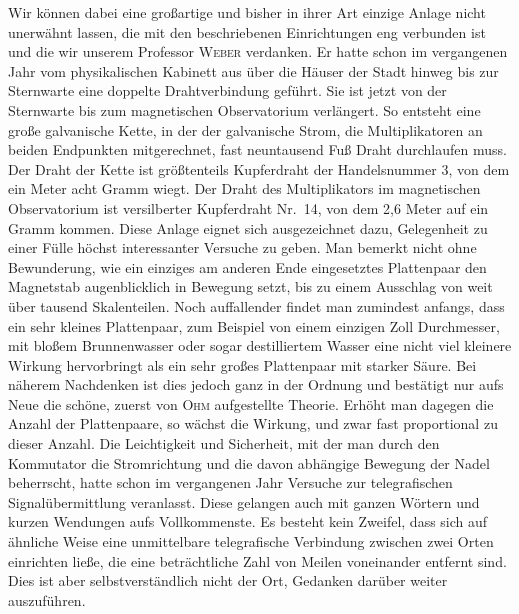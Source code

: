 Wir können dabei eine großartige und bisher in ihrer Art einzige Anlage nicht unerwähnt lassen, die mit den beschriebenen Einrichtungen eng verbunden ist und die wir unserem Professor \textsc{Weber} verdanken. Er hatte schon im vergangenen Jahr vom physikalischen Kabinett aus über die Häuser der Stadt hinweg bis zur Sternwarte eine doppelte Drahtverbindung geführt. Sie ist jetzt von der Sternwarte bis zum magnetischen Observatorium verlängert. So entsteht eine große galvanische Kette, in der der galvanische Strom, die Multiplikatoren an beiden Endpunkten mitgerechnet, fast neuntausend Fuß Draht durchlaufen muss. Der Draht der Kette ist größtenteils Kupferdraht der Handelsnummer 3, von dem ein Meter acht Gramm wiegt. Der Draht des Multiplikators im magnetischen Observatorium ist versilberter Kupferdraht Nr.\ 14, von dem 2,6 Meter auf ein Gramm kommen. Diese Anlage eignet sich ausgezeichnet dazu, Gelegenheit zu einer Fülle höchst interessanter Versuche zu geben. Man bemerkt nicht ohne Bewunderung, wie ein einziges am anderen Ende eingesetztes Plattenpaar den Magnetstab augenblicklich in Bewegung setzt, bis zu einem Ausschlag von weit über tausend Skalenteilen. Noch auffallender findet man zumindest anfangs, dass ein sehr kleines Plattenpaar, zum Beispiel von einem einzigen Zoll Durchmesser, mit bloßem Brunnenwasser oder sogar destilliertem Wasser eine nicht viel kleinere Wirkung hervorbringt als ein sehr großes Plattenpaar mit starker Säure. Bei näherem Nachdenken ist dies jedoch ganz in der Ordnung und bestätigt nur aufs Neue die schöne, zuerst von \textsc{Ohm} aufgestellte Theorie. Erhöht man dagegen die Anzahl der Plattenpaare, so wächst die Wirkung, und zwar fast proportional zu dieser Anzahl. Die Leichtigkeit und Sicherheit, mit der man durch den Kommutator die Stromrichtung und die davon abhängige Bewegung der Nadel beherrscht, hatte schon im vergangenen Jahr Versuche zur telegrafischen Signalübermittlung veranlasst. Diese gelangen auch mit ganzen Wörtern und kurzen Wendungen aufs Vollkommenste. Es besteht kein Zweifel, dass sich auf ähnliche Weise eine unmittelbare telegrafische Verbindung zwischen zwei Orten einrichten ließe, die eine beträchtliche Zahl von Meilen voneinander entfernt sind. Dies ist aber selbstverständlich nicht der Ort, Gedanken darüber weiter auszuführen.

\bigskip
